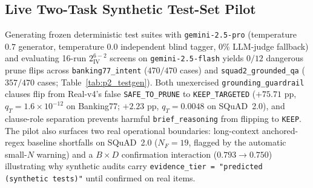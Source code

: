\documentclass[11pt,a4paper]{article}
\begin{document}
\subsection{Live Two-Task Synthetic Test-Set Pilot}
Generating frozen deterministic test suites with \texttt{gemini-2.5-pro} (temperature $0.7$ generator, temperature $0.0$ independent blind tagger, $0\%$ LLM-judge fallback) and evaluating 16-run $2^{6-2}_{\mathrm{IV}}$ screens on \texttt{gemini-2.5-flash} yields $0/12$ dangerous prune flips across \texttt{banking77\_intent} ($470/470$ cases) and \texttt{squad2\_grounded\_qa} ($357/470$ cases; Table~\ref{tab:p2_testgen}). Both unexercised \texttt{grounding\_guardrail} clauses flip from Real-v4's false \texttt{SAFE\_TO\_PRUNE} to \texttt{KEEP\_TARGETED} ($+75.71\text{ pp}$, $q_T = 1.6\times 10^{-12}$ on Banking77; $+2.23\text{ pp}$, $q_T = 0.0048$ on SQuAD~2.0), and clause-role separation prevents harmful \texttt{brief\_reasoning} from flipping to \texttt{KEEP}. The pilot also surfaces two real operational boundaries: long-context anchored-regex baseline shortfalls on SQuAD~2.0 ($N_F = 19$, flagged by the automatic small-$N$ warning) and a $B \times D$ confirmation interaction ($0.793 \to 0.750$) illustrating why synthetic audits carry \texttt{evidence\_tier = "predicted (synthetic tests)"} until confirmed on real items.
\end{document}
